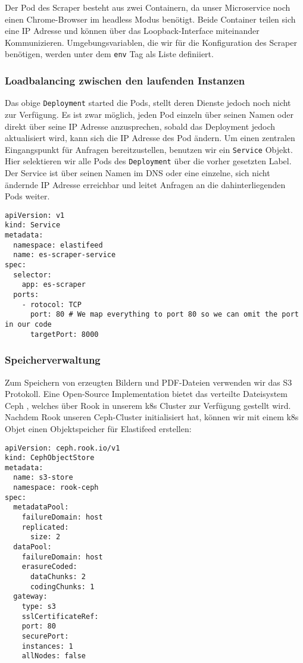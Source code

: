 Der Pod des Scraper besteht aus zwei Containern, da unser Microservice noch einen Chrome-Browser im headless Modus benötigt.
Beide Container teilen sich eine IP Adresse und können über das Loopback-Interface miteinander Kommunizieren.
Umgebungsvariablen, die wir für die Konfiguration des Scraper benötigen, werden unter dem \texttt{env} Tag als Liste definiiert.

\subsubsection{Loadbalancing zwischen den laufenden Instanzen}
Das obige \texttt{Deployment} started die Pods, stellt deren Dienste jedoch noch nicht zur Verfügung.
Es ist zwar möglich, jeden Pod einzeln über seinen Namen oder direkt über seine IP Adresse anzusprechen, sobald das Deployment jedoch aktualisiert wird, kann sich die IP Adresse des Pod ändern.
Um einen zentralen Eingangspunkt für Anfragen bereitzustellen, benutzen wir ein \texttt{Service} Objekt.
Hier selektieren wir alle Pods des \texttt{Deployment} über die vorher gesetzten Label.
Der Service ist über seinen Namen im DNS oder eine einzelne, sich nicht ändernde IP Adresse erreichbar und leitet Anfragen an die dahinterliegenden Pods weiter.

\begin{verbatim}
apiVersion: v1
kind: Service
metadata:
  namespace: elastifeed
  name: es-scraper-service
spec:
  selector:
    app: es-scraper
  ports:
    - rotocol: TCP
      port: 80 # We map everything to port 80 so we can omit the port in our code
      targetPort: 8000
\end{verbatim}

\subsubsection{Speicherverwaltung}
Zum Speichern von erzeugten Bildern und PDF-Dateien verwenden wir das S3 Protokoll.
Eine Open-Source Implementation bietet das verteilte Dateisystem Ceph \cite{ceph}, welches über Rook \cite{rook} in unserem \ac{k8s} Cluster zur Verfügung gestellt wird.
Nachdem Rook unseren Ceph-Cluster initialisiert hat, können wir mit einem \ac{k8s} Objet einen Objektspeicher für Elastifeed erstellen:

\begin{verbatim}
apiVersion: ceph.rook.io/v1
kind: CephObjectStore
metadata:
  name: s3-store
  namespace: rook-ceph
spec:
  metadataPool:
    failureDomain: host
    replicated:
      size: 2
  dataPool:
    failureDomain: host
    erasureCoded:
      dataChunks: 2
      codingChunks: 1
  gateway:
    type: s3
    sslCertificateRef:
    port: 80
    securePort:
    instances: 1
    allNodes: false
\end{verbatim}

